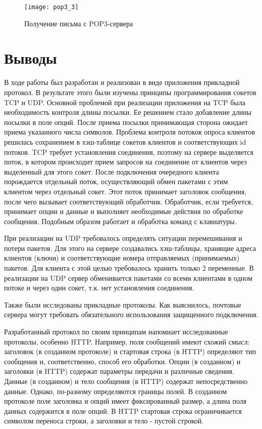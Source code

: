 \begin{figure}[H]
	\begin{center}
		\texttt{[image: pop3\_3]}
		\caption{Получение письма с POP3-сервера} 
		\label{pic:pic_name} %
	\end{center}
\end{figure}

\section{Выводы}

В ходе работы был разработан и реализован в виде приложения прикладной протокол. В результате этого были изучены принципы программирования сокетов TCP и UDP. Основной проблемой при реализации приложения на TCP была необходимость контроля длины посылки. Ее решением стало добавление длины посылки в поле опций. После приема посылки принимающая сторона ожидает приема указанного числа символов. Проблема контроля потоков опроса клиентов решилась сохранением в хэш-таблице сокетов клиентов и соответствующих id потоков. TCP требует установления соединения, поэтому на сервере выделяется поток, в котором происходит прием запросов на соединение от клиентов через выделенный для этого сокет. После подключения очередного клиента порождается отдельный поток, осуществляющий обмен пакетами с этим клиентом через отдельный сокет. Этот поток принимает заголовок сообщения, после чего вызывает соответствующий обработчик. Обработчик, если требуется, принимает опции и данные и выполняет необходимые действия по обработке сообщения. Подобным образом работает и обработка команд с клавиатуры.

При реализации на UDP требовалось определять ситуации перемешивания и потери пакетов. Для этого на сервере создавались хэш-таблицы, хранящие адреса клиентов (ключи) и соответствующие номера отправляемых (принимаемых) пакетов. Для клиента с этой целью требовалось хранить только 2 переменные. В реализации на UDP сервер обменивается пакетами со всеми клиентами в одном потоке и через один сокет, т.к. нет установления соединения.

Также были исследованы прикладные протоколы. Как выяснилось, почтовые сервера могут требовать обязательного использования защищенного подключения.

Разработанный протокол по своим принципам напомиает исследованные протоколы, особенно HTTP. Например, поля сообщений имеют схожий смысл: заголовок (в созданном протоколе) и стартовая строка (в HTTP) определяют тип сообщения и, соответственно, способ его обработки. Опции (в созданном) и заголовки (в HTTP) содержат параметры передачи и различные сведения. Данные (в созданном) и тело сообщения (в HTTP) содержат непосредственно данные. Однако, по-разному определяются границы полей. В созданном протоколе поле заголовка и опций имеет фиксированный размер, а длина поля данных содержится в поле опций. В HTTP стартовая строка ограничивается символом переноса строки, а заголовки и тело - пустой строкой.

